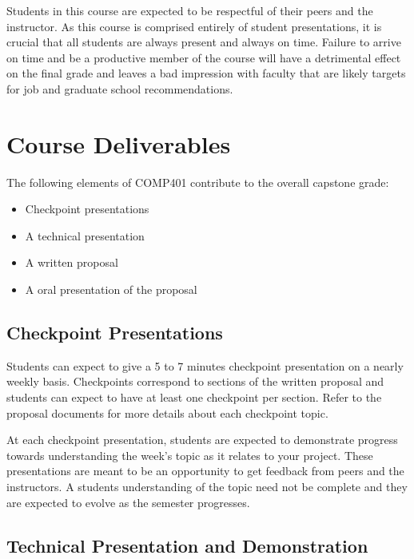 \documentclass[10pt]{article}
\begin{document}
Students in this course are expected to be respectful of their peers and the instructor. As this course is comprised entirely of student presentations, it is crucial that all students are always present and always on time.  Failure to arrive on time and be a productive member of the course will have a detrimental effect on the final grade and leaves a bad impression with faculty that are likely targets for job and graduate school recommendations.

\section{Course Deliverables}

The following elements of COMP401 contribute to the overall capstone grade:
\begin{itemize}
\item Checkpoint presentations
\item A technical presentation
\item A written proposal
\item A oral presentation of the proposal
\end{itemize}


\subsection{Checkpoint Presentations}

Students can expect to give a 5 to 7 minutes checkpoint presentation on a nearly weekly basis. Checkpoints correspond to sections of the written proposal and students can expect to have at least one checkpoint per section. Refer to the proposal documents for more details about each checkpoint topic. 

At each checkpoint presentation, students are expected to demonstrate progress towards understanding the week's topic as it relates to your project.  These presentations are meant to be an opportunity to get feedback from peers and the instructors.  A students understanding of the topic need not be complete and they are expected to evolve as the semester progresses. 

\subsection{Technical Presentation and Demonstration}
\end{document}
